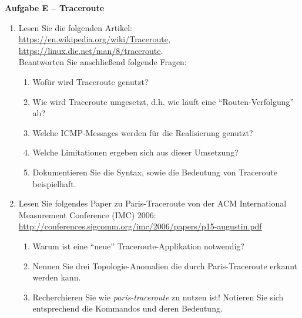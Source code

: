 \documentclass[paper=a4,fontsize=11pt]{scrartcl}%
\numberwithin{equation}{section}
\begin{document}
\begin{center}\Large{\textbf{Aufgabe E -- Traceroute}}\end{center}\vskip0.2in
\begin{enumerate}
	\item Lesen Sie die folgenden Artikel:\\
	\url{https://en.wikipedia.org/wiki/Traceroute},\\
	\url{https://linux.die.net/man/8/traceroute}.\\
	Beantworten Sie anschließend folgende Fragen:
	\begin{enumerate}
		\item Wofür wird Traceroute genutzt?
		\item Wie wird Traceroute umgesetzt, d.h. wie läuft eine \enquote{Routen-Verfolgung} ab? 
		\item Welche ICMP-Messages werden für die Realisierung genutzt?
		\item Welche Limitationen ergeben sich aus dieser Umsetzung?
		\item Dokumentieren Sie die Syntax, sowie die Bedeutung von Traceroute beispielhaft.
	\end{enumerate}
	\item Lesen Sie folgendes Paper zu Paris-Traceroute \cite{Augustin2006ATA} von der ACM International Measurement Conference (IMC) 2006:\\
	\url{http://conferences.sigcomm.org/imc/2006/papers/p15-augustin.pdf}
	\begin{enumerate}
		\item Warum ist eine \enquote{neue} Traceroute-Applikation notwendig?
		\item Nennen Sie drei Topologie-Anomalien die durch Paris-Traceroute erkannt werden kann.
		\item Recherchieren Sie wie \emph{paris-traceroute} zu nutzen ist! Notieren Sie sich entsprechend die Kommandos und deren Bedeutung.
	\end{enumerate}
\end{enumerate}
\printbibliography
\end{document}

